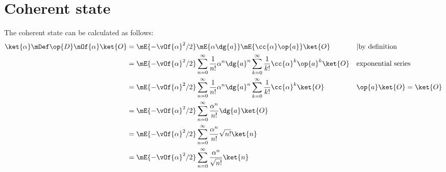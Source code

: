 \section{Coherent state}
The coherent state  can be calculated as follows:
\begin{align}
	\ket{\alpha} \mDef \op{D}\nOf{\alpha}\ket{O}&  = \mE{-\vOf{\alpha}^2/2}\mE{\alpha\dg{a}}\mE{\cc{\alpha}\op{a}}\ket{O} && |\text{by definition} \\
	& = \mE{-\vOf{\alpha}^2/2}\sum\limits_{n=0}^{\infty}\frac{1}{n!} \alpha^n \dg{a}^n\sum\limits_{k=0}^{\infty}\frac{1}{k!} \cc{\alpha}^k \op{a}^k\ket{O} && \text{exponential series}\\
	& = \mE{-\vOf{\alpha}^2/2}\sum\limits_{n=0}^{\infty}\frac{1}{n!} \alpha^n \dg{a}^n\sum\limits_{k=0}^{\infty}\frac{1}{k!}\cc{\alpha}^k \ket{O} && \op{a}\ket{O} = \ket{O} \\
	& = \mE{-\vOf{\alpha}^2/2}\sum\limits_{n=0}^{\infty} \frac{\alpha^n}{n!} \dg{a}\ket{O} \\
	& = \mE{-\vOf{\alpha}^2/2}\sum\limits_{n=0}^{\infty} \frac{\alpha^n}{n!} \sqrt{n!}\ket{n} \\
	& = \mE{-\vOf{\alpha}^2/2}\sum\limits_{n=0}^{\infty} \frac{\alpha^n}{\sqrt{n!}} \ket{n} \\
\end{align}

